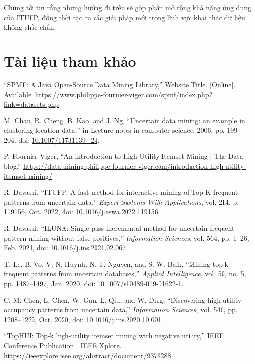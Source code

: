 \documentclass[conference]{IEEEtran}
\begin{document}
Chúng tôi tin rằng những hướng đi trên sẽ góp phần mở rộng khả năng ứng dụng của ITUFP, đồng thời tạo ra các giải pháp mới trong lĩnh vực khai thác dữ liệu không chắc chắn.

\section{Tài liệu tham khảo}

\begin{thebibliography}{99}

``SPMF: A Java Open-Source Data Mining Library,'' Website Title. [Online]. Available: \url{https://www.philippe-fournier-viger.com/spmf/index.php?link=datasets.php}

M. Chau, R. Cheng, B. Kao, and J. Ng, “Uncertain data mining: an example in clustering location data,” in Lecture notes in computer science, 2006, pp. 199–204. doi: \url{10.1007/11731139_24}.

P. Fournier-Viger, “An introduction to High-Utility Itemset Mining | The Data blog.” \url{https://data-mining.philippe-fournier-viger.com/introduction-high-utility-itemset-mining/}

R. Davashi, ``ITUFP: A fast method for interactive mining of Top-K frequent patterns from uncertain data,'' \textit{Expert Systems With Applications}, vol. 214, p. 119156, Oct. 2022, doi: \url{10.1016/j.eswa.2022.119156}.

R. Davashi, ``ILUNA: Single-pass incremental method for uncertain frequent pattern mining without false positives,'' \textit{Information Sciences}, vol. 564, pp. 1–26, Feb. 2021, doi: \url{10.1016/j.ins.2021.02.067}.

T. Le, B. Vo, V.-N. Huynh, N. T. Nguyen, and S. W. Baik, ``Mining top-k frequent patterns from uncertain databases,'' \textit{Applied Intelligence}, vol. 50, no. 5, pp. 1487–1497, Jan. 2020, doi: \url{10.1007/s10489-019-01622-1}.

C.-M. Chen, L. Chen, W. Gan, L. Qiu, and W. Ding, ``Discovering high utility-occupancy patterns from uncertain data,'' \textit{Information Sciences}, vol. 546, pp. 1208–1229, Oct. 2020, doi: \url{10.1016/j.ins.2020.10.001}.

“TopHUI: Top-k high-utility itemset mining with negative utility,” IEEE Conference Publication | IEEE Xplore. \url{https://ieeexplore.ieee.org/abstract/document/9378288}


\end{thebibliography}
\end{document}
